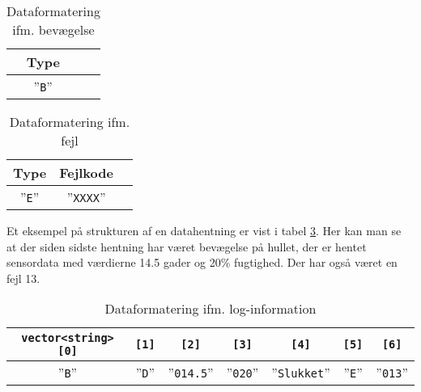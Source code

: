 \begin{table}[h]
	\caption{Dataformatering ifm. bevægelse}
	\centering
	\begin{tabular}{|c|c|}
		\hline 
		\textbf{Type} \\ 
		\hline 
		''\verb+B+'' \\ 
		\hline 
	\end{tabular} 
	\label{table:SWDataprotokol-bevaegelse}
\end{table}

\begin{table}[h]
	\caption{Dataformatering ifm. fejl}
	\centering
	\begin{tabular}{|c|c|c|}
		\hline 
		\textbf{Type} & \textbf{Fejlkode} \\ 
		\hline 
		''\verb+E+'' & ''\verb+XXXX+'' \\ 
		\hline 
	\end{tabular} 
	\label{table:SWDataprotokol-error}
\end{table}

Et eksempel på strukturen af en datahentning er vist i tabel \ref{table:SWDataprotokol-eksempel}. Her kan man se at der siden sidste hentning har været bevægelse på hullet, der er hentet sensordata med værdierne 14.5 gader og 20\% fugtighed. Der har også været en fejl 13.

\begin{table}[h]
	\caption{Dataformatering ifm. log-information}
	\centering
	\begin{tabular}{|c|c|c|c|c|c|c|}
		\hline
		\verb+vector<string>[0]+ & \verb+[1]+ & \verb+[2]+ & \verb+[3]+ & \verb+[4]+ & \verb+[5]+ & \verb+[6]+ \\
		\hline 
		''\verb+B+'' & ''\verb+D+'' & ''\verb+014.5+'' & ''\verb+020+'' & ''\verb+Slukket+'' & ''\verb+E+'' & ''\verb+013+'' \\ 
		\hline 
	\end{tabular} 
	\label{table:SWDataprotokol-eksempel}
\end{table}